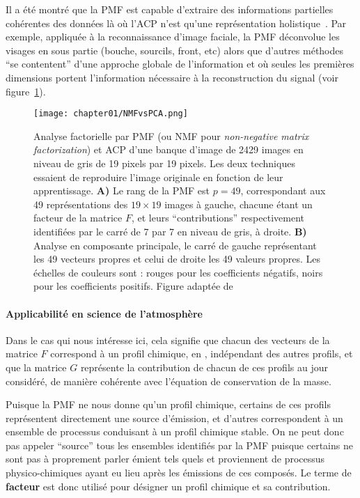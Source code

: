 Il a été montré que la PMF est capable d'extraire des informations partielles cohérentes des
données là où l'ACP n'est qu'une représentation holistique~\autocite{leeLearning1999}. Par
exemple, appliquée à la reconnaissance d'image faciale, la PMF déconvolue les visages en
sous partie (bouche, sourcils, front, etc) alors que d'autres méthodes ``se contentent''
d'une approche globale de l'information et où seules les premières dimensions portent
l'information nécessaire à la reconstruction du signal (voir
figure~\ref{fig:chapter01/NMFvsPCA}).

\begin{figure}[ht]
    \centering
    \texttt{[image: chapter01/NMFvsPCA.png]}
    \caption{Analyse factorielle par PMF (ou NMF pour \textit{non-negative matrix
    factorization}) et ACP d'une banque d'image de 2429 images en niveau de gris de 19
    pixels par 19 pixels. Les deux techniques essaient de reproduire l'image originale en
    fonction de leur apprentissage.
    \textbf{A)} Le rang de la PMF est $p=49$, correspondant aux 49
    représentations des $19\times19$ images à gauche, chacune étant un facteur de la
    matrice $F$, et leurs ``contributions'' respectivement identifiées par le carré de 7 par
    7 en niveau de gris, à droite.
    \textbf{B)} Analyse en composante principale, le carré de gauche représentant les 49
    vecteurs propres et celui de droite les 49 valeurs propres.
    Les échelles de couleurs sont : rouges pour les coefficients négatifs, noirs pour les
    coefficients positifs.
    Figure adaptée de \cite{leeLearning1999}}%
    \label{fig:chapter01/NMFvsPCA}
\end{figure}

\paragraph{Applicabilité en science de l'atmosphère}%
\label{par:applicabilité_en_science_de_l_atmosphère}

Dans le cas qui nous intéresse ici, cela signifie que chacun des vecteurs de la matrice
$F$ correspond à un profil chimique, en \si{\ugm}, indépendant des autres profils, et
que la matrice $G$ représente la contribution de chacun de ces profils au jour
considéré, de manière cohérente avec l'équation de conservation de la masse.

Puisque la PMF ne nous donne qu'un profil chimique, certains de ces profils représentent
directement une source d'émission, et d'autres correspondent à un ensemble de processus
conduisant à un profil chimique stable. On ne peut donc pas appeler ``source'' tous les ensembles
identifiés par la PMF puisque certains ne sont pas à proprement parler émient tels quels et
proviennent de processus physico-chimiques ayant eu lieu après les émissions de ces
composés.
Le terme de \textbf{facteur} est donc utilisé pour désigner un profil chimique et sa
contribution.

